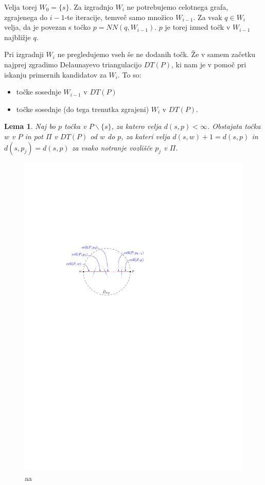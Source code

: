 \documentclass[a4paper, 12pt]{book}
\newtheorem{lema}[izrek]{Lema}
\begin{document}
Velja torej $W_0 = \{s\}$. Za izgradnjo $W_i$ ne potrebujemo celotnega grafa, zgrajenega do $i-1$-te iteracije, temveč samo množico $W_{i-1}$.  Za vsak $q\in W_i$ velja, da je povezan s točko $p = NN(q, W_{i-1})$. $p$ je torej izmed točk v $W_{i-1}$ najbližje $q$.

Pri izgradnji $W_i$ ne pregledujemo vseh še ne dodanih točk. Že v samem začetku najprej zgradimo Delaunayevo triangulacijo $DT(P)$, ki nam je v pomoč pri iskanju primernih kandidatov za $W_i$. To so:

\begin{itemize}
\item točke sosednje $W_{i-1}$ v $DT(P)$
\item točke sosednje (do tega trenutka zgrajeni) $W_i$ v $DT(P)$.
\end{itemize} 

\begin{lema}
\label{lema1}
Naj bo $p$ točka v $P\backslash \{s\}$, za katero velja $d(s,p) < \infty$. Obstajata točka $w$ v $P$ in pot $\Pi$ v $DT(P)$ od $w$ do $p$, za kateri velja $d(s,w)+1 = d(s,p)$ in $d(s,p_j) = d(s,p)$ za vsako notranje vozlišče $p_j$ v $\Pi$.
\end{lema}

\begin{figure}
\centerline{\includegraphics[scale=1]{pics/path.pdf}}
\caption{aa}
\label{c1c2}
\end{figure}
\end{document}
